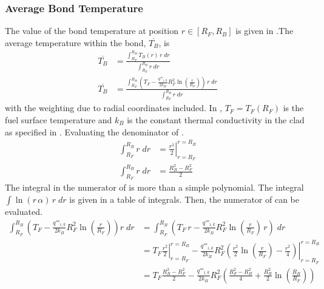     \subsubsection{Average Bond Temperature}
      \label{sec:average_bond_temp}
      The value of the bond temperature at position $r \in [R_F,R_B]$
      is given in .The average temperature within the bond,
      $\overline{T_B}$, is 
      \begin{align}
        \overline{T_B} &= \frac{\int_{R_F}^{R_B} T_B(r) \, r \; dr}
          {\int_{R_F}^{R_B} r \; dr} \\
        \label{eq:tbbar_integral}
        \overline{T_B} &= \frac{\int_{R_F}^{R_B} \left( T_F -
          \frac{q'''_{i,k}}{2 k_B} R_F^2 \ln\left(\frac{r}{R_F}\right) \right)
          \, r \; dr} {\int_{R_F}^{R_B} r \; dr}
      \end{align}
      with the weighting due to radial coordinates included.
      In , $T_F = T_F(R_F)$ is the fuel surface
      temperature and $k_B$ is the constant thermal conductivity in the clad as
      specified in .
      Evaluating the denominator of .
      \begin{align}
        \int_{R_F}^{R_B} r \; dr &= \left. \frac{r^2}{2} 
          \right|_{r=R_F}^{r=R_B}\\
        \label{eq:tbbar_denominator}
        \int_{R_F}^{R_B} r \; dr &= \frac{R_B^2 - R_F^2}{2}
      \end{align}
      The integral in the numerator of  is more than a
      simple polynomial. The integral $\int \ln(r \, \alpha) \, r \; dr$ is
      given in a table of integrals. Then, the numerator of 
       can be evaluated. 
      \begin{align}
        \int_{R_F}^{R_B} \left( T_F - \frac{q'''_{i,k}}{2 k_B} R_F^2
          \ln\left(\frac{r}{R_F}\right) \right) r \; dr 
          &= \int_{R_F}^{R_B}
          \left( T_F \, r - \frac{q'''_{i,k}}{2 k_B}R_F^2
          \ln\left(\frac{r}{R_F}\right) \, r \right) \; dr \\
        &=
          \left. T_F \frac{r^2}{2} \right|_{r=R_F}^{r=R_B} - 
          \left. \frac{q'''_{i,k}}{2 k_B}R_F^2 \left( \frac{r^2}{2}
          \ln\left(\frac{r}{R_F}\right) - \frac{r^2}{4} \right)
          \right|_{r=R_F}^{r=R_B} \\
        \label{eq:tbbar_numerator}
        &= 
          T_F \frac{R_B^2-R_F^2}{2} - \frac{q'''_{i,k}}{2 k_B} R_F^2
          \left( \frac{R_F^2 - R_B^2}{4} + \frac{R_B^2}{2}
          \ln\left(\frac{R_B}{R_F}\right) \right)
      \end{align}
